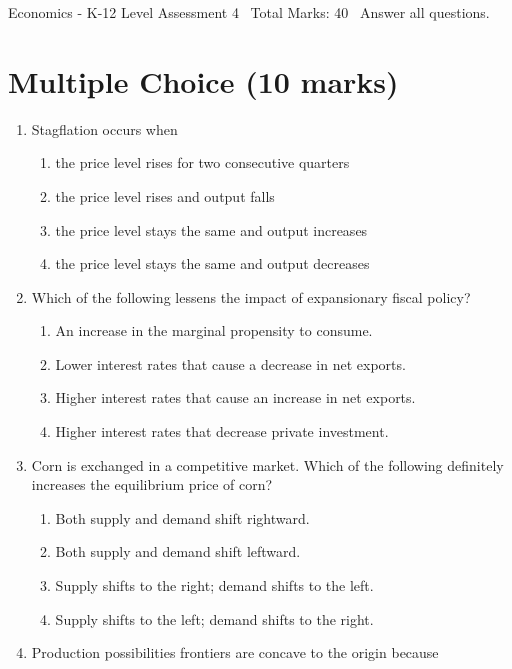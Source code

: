 \documentclass[12pt]{article}
\begin{document}
\begin{center}
Economics - K-12 Level Assessment 4 \
Total Marks: 40 \
Answer all questions.
\end{center}

\section*{Multiple Choice (10 marks)}
\begin{enumerate}[label=\arabic*.]
\item Stagflation occurs when
\begin{enumerate}[label=(\alph*)]
    \item the price level rises for two consecutive quarters
    \item the price level rises and output falls
    \item the price level stays the same and output increases
    \item the price level stays the same and output decreases
\end{enumerate}
\item Which of the following lessens the impact of expansionary fiscal policy?
\begin{enumerate}[label=(\alph*)]
    \item An increase in the marginal propensity to consume.
    \item Lower interest rates that cause a decrease in net exports.
    \item Higher interest rates that cause an increase in net exports.
    \item Higher interest rates that decrease private investment.
\end{enumerate}
\item Corn is exchanged in a competitive market. Which of the following definitely increases the
equilibrium price of corn?
\begin{enumerate}[label=(\alph*)]
    \item Both supply and demand shift rightward.
    \item Both supply and demand shift leftward.
    \item Supply shifts to the right; demand shifts to the left.
    \item Supply shifts to the left; demand shifts to the right.
\end{enumerate}
\item Production possibilities frontiers are concave to the origin because
\begin{enumerate}[label=(\alph*)]

\end{enumerate}
\end{enumerate}
\end{document}
